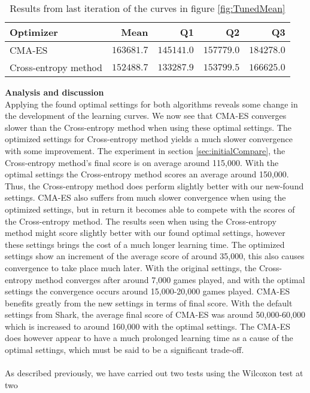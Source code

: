 \begin{table}[H]
\centering
\small
\begin{tabular}{l r r r r}
Optimizer & Mean & Q1 & Q2 & Q3\\
\hline
CMA-ES  & $163681.7$ & $145141.0$ & $157779.0$ & $184278.0$\\
Cross-entropy method & $152488.7$ & $133287.9$ & $153799.5$ & $166625.0$\\
\end{tabular}
\caption{Results from last iteration of the curves in figure \ref{fig:TunedMean}
\label{table:tunedResultTable}}
\end{table}
\vspace{0.5cm}
\textbf{Analysis and discussion}\\
Applying the found optimal settings for both algorithms reveals some change in the 
development of the learning curves. We now see that CMA-ES converges slower than
the Cross-entropy method when using these optimal settings. 
The optimized settings for Cross-entropy method yields a much slower convergence
with some improvement. The experiment in section \ref{sec:initialCompare}, the Cross-entropy
method's final score is on average around 115,000. With the optimal settings
the Cross-entropy method scores an average around 150,000. Thus, the Cross-entropy 
method does perform slightly better with our new-found settings.
CMA-ES also suffers from much slower convergence 
when using the optimized settings, but in return it becomes able to compete with
the scores of the Cross-entropy method. The results seen when using the Cross-entropy
method  might
score slightly better with our found optimal settings, however these settings
brings the cost of a much longer learning time. The optimized settings show
an increment of the average score of around 35,000, this also causes convergence to
take place much later. With the original settings, the Cross-entropy method converges 
after around 7,000 games played, and with the optimal settings the convergence 
occurs around 15,000-20,000 games played.
CMA-ES benefits greatly from the new settings in terms of final score.
With the default settings from Shark, the average final score of CMA-ES was around
50,000-60,000 which is increased to around 160,000 with the optimal settings.
The CMA-ES does however appear to have a much prolonged learning time
as a cause of the optimal settings, which must be said to be a significant trade-off.\\
\\
As described previously, we have carried out two tests using the Wilcoxon test at two 
